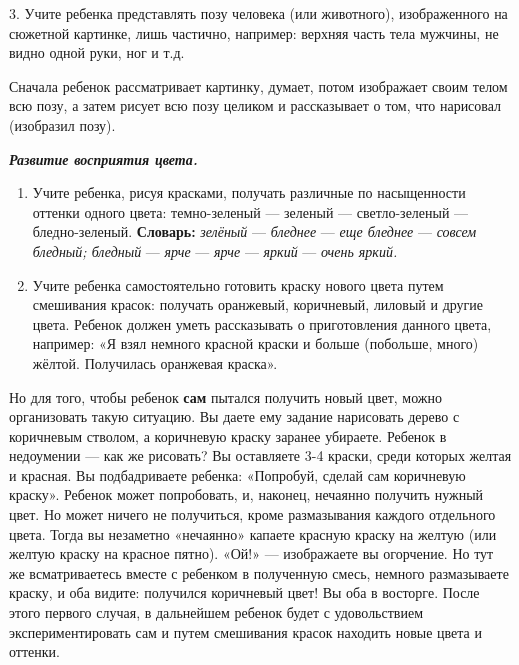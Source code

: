 \documentclass[a5paper]{book}
\renewcommand{\emph}[1]{\textit{#1}}
\begin{document}
3. Учите ребенка представлять позу человека (или животного),
изображенного на сюжетной картинке, лишь частично, например: верхняя
часть тела мужчины, не видно одной руки, ног и т.д.

Сначала ребенок рассматривает картинку, думает, потом изображает своим
телом всю позу, а затем рисует всю позу целиком и рассказывает о том,
что нарисовал (изобразил позу).

\emph{\textbf{Развитие восприятия цвета.}}


\begin{enumerate}
\def\labelenumi{\arabic{enumi}.}
\item
  
  Учите ребенка, рисуя красками, получать различные по насыщенности
  оттенки одного цвета: темно-зеленый --- зеленый --- светло-зеленый ---
  бледно-зеленый. \textbf{Словарь:} \emph{зелёный} --- \emph{бледнее}
  --- \emph{еще бледнее} --- \emph{совсем бледный; бледный} ---
  \emph{ярче} --- \emph{ярче} --- \emph{яркий} --- \emph{очень яркий.}
  
\item
  
  Учите ребенка самостоятельно готовить краску нового цвета путем
  смешивания красок: получать оранжевый, коричневый, лиловый и другие
  цвета. Ребенок должен уметь рассказывать о приготовления данного
  цвета, например: «Я взял немного красной краски и больше (побольше,
  много) жёлтой. Получилась оранжевая краска».
  
\end{enumerate}


Но для того, чтобы ребенок \textbf{сам} пытался получить новый цвет,
можно организовать такую ситуацию. Вы даете ему задание нарисовать
дерево с коричневым стволом, а коричневую краску заранее убираете.
Ребенок в недоумении --- как же рисовать? Вы оставляете 3-4 краски,
среди которых желтая и красная. Вы подбадриваете ребенка: «Попробуй,
сделай сам коричневую краску». Ребенок может попробовать, и, наконец,
нечаянно получить нужный цвет. Но может ничего не получиться, кроме
размазывания каждого отдельного цвета. Тогда вы незаметно «нечаянно»
капаете красную краску на желтую (или желтую краску на красное пятно).
«Ой!» --- изображаете вы огорчение. Но тут же всматриваетесь вместе с
ребенком в полученную смесь, немного размазываете краску, и оба видите:
получился коричневый цвет! Вы оба в восторге. После этого первого
случая, в дальнейшем ребенок будет с удовольствием экспериментировать
сам и путем смешивания красок находить новые цвета и оттенки.
\end{document}
